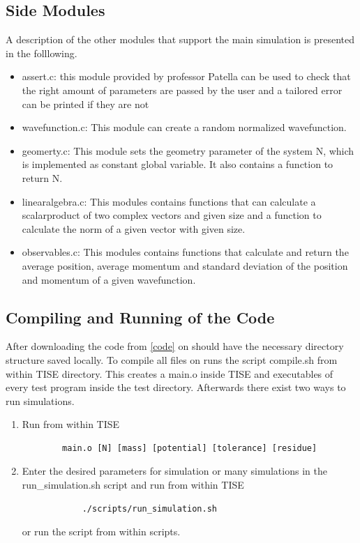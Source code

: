 \documentclass{article}
\begin{document}
\subsection{Side Modules}
A description of the other modules that support the main simulation is presented in the folllowing.
\begin{itemize}
    \item {\selectfont assert.c}: this module provided by professor Patella can be used to check that the right amount of parameters are passed by the user and a tailored error can be printed if they are not
    \item {\selectfont wavefunction.c}: This module can create a random normalized wavefunction.
    \item {\selectfont geomerty.c}: This module sets the geometry parameter of the system N, which is implemented as constant global variable. It also contains a function to return N.
    \item {\selectfont linearalgebra.c}: This modules contains functions that can calculate a scalarproduct of two complex vectors and given size and a function to calculate the norm of a given vector with given size.
    \item {\selectfont observables.c}: This modules contains functions that calculate and return the average position, average momentum and standard deviation of the position and momentum of a given wavefunction.
\end{itemize}
%
\subsection{Compiling and Running of the Code}
After downloading the code from \ref{code} on should have the necessary directory structure saved locally.
To compile all files on runs the script {\selectfont compile.sh} from within TISE directory.
This creates a {\selectfont main.o} inside TISE and executables of every test program inside the test directory.
Afterwards there exist two ways to run simulations. 
\begin{enumerate}
    \item Run from within TISE \begin{verbatim}
        main.o [N] [mass] [potential] [tolerance] [residue]
    \end{verbatim}
    \item Enter the desired parameters for simulation or many simulations in the {\selectfont run\_simulation.sh} script and run from within TISE 
        \begin{verbatim}
            ./scripts/run_simulation.sh
        \end{verbatim} 
        or run the script from within scripts.
\end{enumerate}
\end{document}
